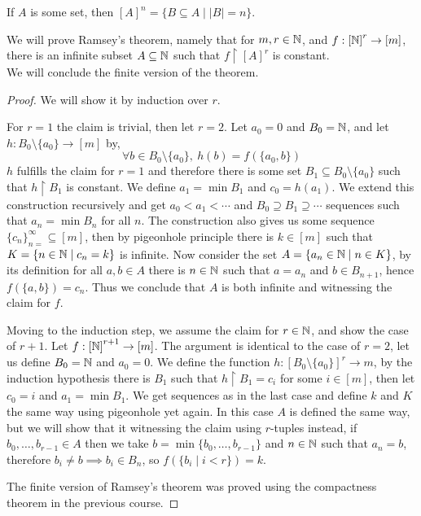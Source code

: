 \question{}
\begin{remark}
	If $A$ is some set, then ${[A]}^n = \{ B \subseteq A \mid |B| = n \}$.
\end{remark}
We will prove Ramsey's theorem,
namely that for $m, r \in \mathbb{N}$, and $f : {[ \mathbb{N} ]}^r \to [m]$, there is an infinite subset $A \subseteq \mathbb{N}$ such that $f \restriction {[ A ]}^r$ is constant. \\
We will conclude the finite version of the theorem.
\begin{proof}
	We will show it by induction over $r$.

	For $r = 1$ the claim is trivial, then let $r = 2$.
	Let $a_0 = 0$ and $B_0 = \mathbb{N}$, and let $h : B_0 \setminus \{ a_0 \} \to [m]$ by,
	\[
		\forall b \in B_0 \setminus \{ a_0 \},\ h(b) = f(\{a_0, b\})
	\]
	$h$ fulfills the claim for $r = 1$ and therefore there is some set $B_1 \subseteq B_0 \setminus \{ a_0 \}$ such that $h \restriction B_1$ is constant.
	We define $a_1 = \min B_1$ and $c_0 = h(a_1)$.
	We extend this construction recursively and get $a_0 < a_1 < \cdots$ and $B_0 \supseteq B_1 \supseteq \cdots$ sequences such that $a_n = \min B_n$ for all $n$.
	The construction also gives us some sequence ${\{ c_n \}}_{n = }^\infty \subseteq [m]$, then by pigeonhole principle there is $k \in [m]$ such that $K = \{ n \in \mathbb{N} \mid c_n = k \}$ is infinite.
	Now consider the set $A = \{ a_n \in \mathbb{N} \mid n \in K \}$, by its definition for all $a, b \in A$ there is $n \in \mathbb{N}$ such that $a = a_n$ and $b \in B_{n + 1}$, hence $f(\{a, b\}) = c_n$.
	Thus we conclude that $A$ is both infinite and witnessing the claim for $f$.

	Moving to the induction step, we assume the claim for $r \in \mathbb{N}$, and show the case of $r + 1$.
	Let $f : {[ \mathbb{N} ]}^{r + 1} \to [m]$.
	The argument is identical to the case of $r = 2$, let us define $B_0 = \mathbb{N}$ and $a_0 = 0$.
	We define the function $h : {[ B_0 \setminus \{ a_0 \} ]}^r \to m$, by the induction hypothesis there is $B_1$ such that $h \restriction B_1 = c_i$ for some $i \in [m]$, then let $c_0 = i$ and $a_1 = \min B_1$.
	We get sequences as in the last case and define $k$ and $K$ the same way using pigeonhole yet again.
	In this case $A$ is defined the same way, but we will show that it witnessing the claim using $r$-tuples instead,
	if $b_0, \ldots, b_{r - 1} \in A$ then we take $b = \min\{ b_0, \ldots, b_{r - 1} \}$ and $n \in \mathbb{N}$ such that $a_n = b$, therefore $b_i \ne b \implies b_i \in B_n$, so $f(\{ b_i \mid i < r \}) = k$.

	The finite version of Ramsey's theorem was proved using the compactness theorem in the previous course.
\end{proof}


